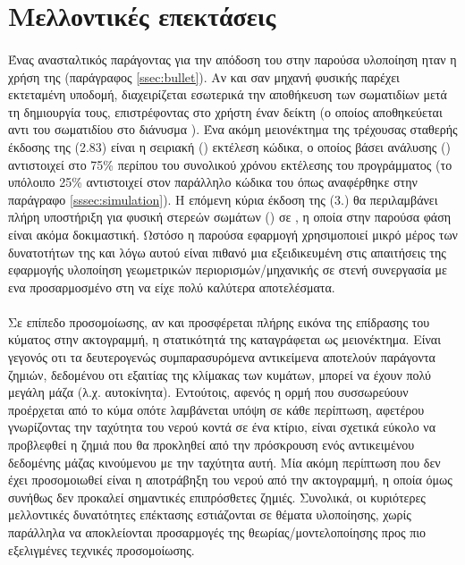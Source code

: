 \section{Μελλοντικές επεκτάσεις}

\paragraph{} Ένας ανασταλτικός παράγοντας για την απόδοση του  στην παρούσα
υλοποίηση ηταν η χρήση της  (παράγραφος \ref{ssec:bullet}). Αν και σαν μηχανή
φυσικής παρέχει εκτεταμένη υποδομή, διαχειρίζεται εσωτερικά την αποθήκευση των σωματιδίων
μετά τη δημιουργία τους, επιστρέφοντας στο χρήστη έναν δείκτη (ο οποίος αποθηκεύεται αντι
του σωματιδίου στο διάνυσμα ). Ένα ακόμη μειονέκτημα της τρέχουσας σταθερής
έκδοσης της  (2.83) είναι η σειριακή () εκτέλεση κώδικα, ο
οποίος βάσει ανάλυσης () αντιστοιχεί στο 75\% περίπου του συνολικού χρόνου
εκτέλεσης του προγράμματος (το υπόλοιπο 25\% αντιστοιχεί στον παράλληλο κώδικα του
 όπως αναφέρθηκε στην παράγραφο \ref{sssec:simulation}). Η επόμενη κύρια έκδοση
της  (3.) θα περιλαμβάνει πλήρη υποστήριξη για φυσική στερεών σωμάτων
() σε , η οποία στην παρούσα φάση είναι ακόμα
δοκιμαστική. Ωστόσο η παρούσα εφαρμογή χρησιμοποιεί μικρό μέρος των δυνατοτήτων της
 και λόγω αυτού είναι πιθανό μια εξειδικευμένη στις απαιτήσεις της εφαρμογής
υλοποίηση γεωμετρικών περιορισμών/μηχανικής σε στενή συνεργασία με ενα προσαρμοσμένο στη
  να είχε πολύ καλύτερα αποτελέσματα.

\paragraph{} Σε επίπεδο προσομοίωσης, αν και προσφέρεται πλήρης εικόνα της επίδρασης του
κύματος στην ακτογραμμή, η στατικότητά της καταγράφεται ως μειονέκτημα. Είναι γεγονός οτι
τα δευτερογενώς συμπαρασυρόμενα αντικείμενα αποτελούν παράγοντα ζημιών, δεδομένου οτι
εξαιτίας της κλίμακας των κυμάτων, μπορεί να έχουν πολύ μεγάλη μάζα
(λ.χ. αυτοκίνητα). Εντούτοις, αφενός η ορμή που συσσωρεύουν προέρχεται από το κύμα οπότε
λαμβάνεται υπόψη σε κάθε περίπτωση, αφετέρου γνωρίζοντας την ταχύτητα του νερού κοντά σε
ένα κτίριο, είναι σχετικά εύκολο να προβλεφθεί η ζημιά που θα προκληθεί από την πρόσκρουση
ενός αντικειμένου δεδομένης μάζας κινούμενου με την ταχύτητα αυτή. Μία ακόμη περίπτωση που
δεν έχει προσομοιωθεί είναι η αποτράβηξη του νερού από την ακτογραμμή, η οποία όμως
συνήθως δεν προκαλεί σημαντικές επιπρόσθετες ζημιές. Συνολικά, οι κυριότερες μελλοντικές
δυνατότητες επέκτασης εστιάζονται σε θέματα υλοποίησης, χωρίς παράλληλα να αποκλείονται
προσαρμογές της θεωρίας/μοντελοποίησης προς πιο εξελιγμένες τεχνικές προσομοίωσης.


